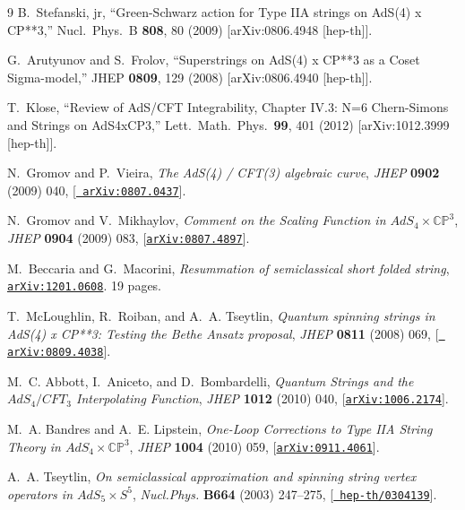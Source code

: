 \documentclass[a4paper,11pt]{article}
\numberwithin{equation}{section}
\begin{document}
\begin{thebibliography} {9}
  B.~Stefanski, jr,
  ``Green-Schwarz action for Type IIA strings on AdS(4) x CP**3,''
  Nucl.\ Phys.\ B {\bf 808}, 80 (2009)
  [arXiv:0806.4948 [hep-th]].

  G.~Arutyunov and S.~Frolov,
  ``Superstrings on AdS(4) x CP**3 as a Coset Sigma-model,''
  JHEP {\bf 0809}, 129 (2008)
  [arXiv:0806.4940 [hep-th]].

  T.~Klose,
  ``Review of AdS/CFT Integrability, Chapter IV.3: N=6 Chern-Simons and Strings on AdS4xCP3,''
  Lett.\ Math.\ Phys.\  {\bf 99}, 401 (2012)
  [arXiv:1012.3999 [hep-th]].

N.~Gromov and P.~Vieira, {\it {The AdS(4) / CFT(3) algebraic curve}},  {\em
  JHEP} {\bf 0902} (2009) 040, [\href{http://xxx.lanl.gov/abs/0807.0437}{{\tt
  arXiv:0807.0437}}].

N.~Gromov and V.~Mikhaylov, {\it {Comment on the Scaling Function in
  $AdS_{4}\times \mathbb{CP}^{3}$}},  {\em JHEP} {\bf 0904} (2009) 083,
  [\href{http://xxx.lanl.gov/abs/0807.4897}{{\tt arXiv:0807.4897}}].

M.~Beccaria and G.~Macorini, {\it {Resummation of semiclassical short folded
  string}},  \href{http://xxx.lanl.gov/abs/1201.0608}{{\tt arXiv:1201.0608}}.
  19 pages.

T.~McLoughlin, R.~Roiban, and A.~A. Tseytlin, {\it {Quantum spinning strings in
  AdS(4) x CP**3: Testing the Bethe Ansatz proposal}},  {\em JHEP} {\bf 0811}
  (2008) 069, [\href{http://xxx.lanl.gov/abs/0809.4038}{{\tt
  arXiv:0809.4038}}].

M.~C. Abbott, I.~Aniceto, and D.~Bombardelli, {\it {Quantum Strings and the
  $AdS_4/CFT_3$ Interpolating Function}},  {\em JHEP} {\bf 1012} (2010) 040,
  [\href{http://xxx.lanl.gov/abs/1006.2174}{{\tt arXiv:1006.2174}}].

M.~A. Bandres and A.~E. Lipstein, {\it {One-Loop Corrections to Type IIA String
  Theory in $AdS_{4}\times\mathbb{CP}^{3}$}},  {\em JHEP} {\bf 1004} (2010)
  059, [\href{http://xxx.lanl.gov/abs/0911.4061}{{\tt arXiv:0911.4061}}].

A.~A. Tseytlin, {\it {On semiclassical approximation and spinning string vertex
  operators in $AdS_{5}\times S^{5}$}},  {\em Nucl.Phys.} {\bf B664} (2003)
  247--275, [\href{http://xxx.lanl.gov/abs/hep-th/0304139}{{\tt
  hep-th/0304139}}].


\end{thebibliography}
\end{document}
